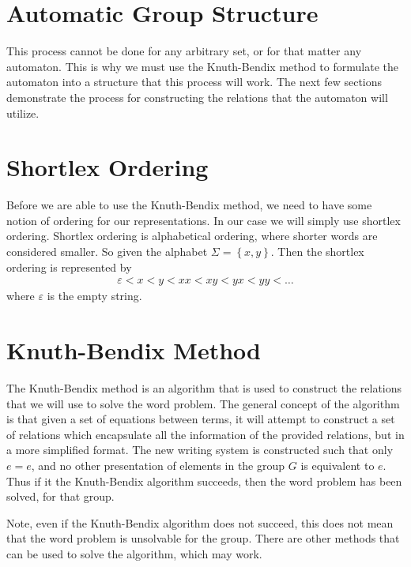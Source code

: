 \documentclass[10pt]{amsart}
\theoremstyle{definition}
\begin{document}
\section{Automatic Group Structure}%
\label{sec:automatic_group_structure}

This process cannot be done for any arbitrary set, or for that matter any
automaton. This is why we must use the Knuth-Bendix method to formulate the
automaton into a structure that this process will work. The next few sections
demonstrate the process for constructing the relations that the automaton will
utilize.

\section{Shortlex Ordering}%
\label{sec:shortlex_ordering}

Before we are able to use the Knuth-Bendix method, we need to have some notion
of ordering for our representations. In our case we will simply use shortlex
ordering. Shortlex ordering is alphabetical ordering, where shorter words are
considered smaller. So given the alphabet $\Sigma=\left\{x,y\right\}$. Then the
shortlex ordering is represented by
\begin{align*}
  \varepsilon<x<y<xx<xy<yx<yy<\ldots
\end{align*}
where $\varepsilon$ is the empty string.

\section{Knuth-Bendix Method}%
\label{sec:kunth_bendix_method}

The Knuth-Bendix method is an algorithm that is used to construct the relations
that we will use to solve the word problem. The general concept of the
algorithm is that given a set of equations between terms, it will attempt to
construct a set of relations which encapsulate all the information of the
provided relations, but in a more simplified format. The new writing system is
constructed such that only $e=e$, and no other presentation of elements in the
group $G$ is equivalent to $e$. Thus if it the Knuth-Bendix algorithm succeeds,
then the word problem has been solved, for that group.

Note, even if the Knuth-Bendix algorithm does not succeed, this does not mean
that the word problem is unsolvable for the group. There are other methods that
can be used to solve the algorithm, which may work.
\end{document}
